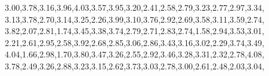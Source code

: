 \documentclass[
]{article}
\newenvironment{Shaded}{\begin{snugshade}}{\end{snugshade}}
\newcommand{\FloatTok}[1]{\textcolor[rgb]{0.00,0.00,0.81}{#1}}
\newcommand{\NormalTok}[1]{#1}
\begin{document}
\begin{Shaded}
\begin{Highlighting}[]
               \FloatTok{3.00}\NormalTok{,}\FloatTok{3.78}\NormalTok{,}\FloatTok{3.16}\NormalTok{,}\FloatTok{3.96}\NormalTok{,}\FloatTok{4.03}\NormalTok{,}\FloatTok{3.57}\NormalTok{,}\FloatTok{3.95}\NormalTok{,}\FloatTok{3.20}\NormalTok{,}\FloatTok{2.41}\NormalTok{,}\FloatTok{2.58}\NormalTok{,}\FloatTok{2.79}\NormalTok{,}\FloatTok{3.23}\NormalTok{,}\FloatTok{2.77}\NormalTok{,}\FloatTok{2.97}\NormalTok{,}\FloatTok{3.34}\NormalTok{,}
               \FloatTok{3.13}\NormalTok{,}\FloatTok{3.78}\NormalTok{,}\FloatTok{2.70}\NormalTok{,}\FloatTok{3.14}\NormalTok{,}\FloatTok{3.25}\NormalTok{,}\FloatTok{2.26}\NormalTok{,}\FloatTok{3.99}\NormalTok{,}\FloatTok{3.10}\NormalTok{,}\FloatTok{3.76}\NormalTok{,}\FloatTok{2.92}\NormalTok{,}\FloatTok{2.69}\NormalTok{,}\FloatTok{3.58}\NormalTok{,}\FloatTok{3.11}\NormalTok{,}\FloatTok{3.59}\NormalTok{,}\FloatTok{2.74}\NormalTok{,}
               \FloatTok{3.82}\NormalTok{,}\FloatTok{2.07}\NormalTok{,}\FloatTok{2.81}\NormalTok{,}\FloatTok{1.74}\NormalTok{,}\FloatTok{3.45}\NormalTok{,}\FloatTok{3.38}\NormalTok{,}\FloatTok{3.74}\NormalTok{,}\FloatTok{2.79}\NormalTok{,}\FloatTok{2.71}\NormalTok{,}\FloatTok{2.83}\NormalTok{,}\FloatTok{2.74}\NormalTok{,}\FloatTok{1.58}\NormalTok{,}\FloatTok{2.94}\NormalTok{,}\FloatTok{3.53}\NormalTok{,}\FloatTok{3.01}\NormalTok{,}
               \FloatTok{2.21}\NormalTok{,}\FloatTok{2.61}\NormalTok{,}\FloatTok{2.95}\NormalTok{,}\FloatTok{2.58}\NormalTok{,}\FloatTok{3.92}\NormalTok{,}\FloatTok{2.68}\NormalTok{,}\FloatTok{2.85}\NormalTok{,}\FloatTok{3.06}\NormalTok{,}\FloatTok{2.86}\NormalTok{,}\FloatTok{3.43}\NormalTok{,}\FloatTok{3.16}\NormalTok{,}\FloatTok{3.02}\NormalTok{,}\FloatTok{2.29}\NormalTok{,}\FloatTok{3.74}\NormalTok{,}\FloatTok{3.49}\NormalTok{,}
               \FloatTok{4.04}\NormalTok{,}\FloatTok{1.66}\NormalTok{,}\FloatTok{2.98}\NormalTok{,}\FloatTok{1.70}\NormalTok{,}\FloatTok{3.80}\NormalTok{,}\FloatTok{3.47}\NormalTok{,}\FloatTok{3.26}\NormalTok{,}\FloatTok{2.55}\NormalTok{,}\FloatTok{2.92}\NormalTok{,}\FloatTok{3.46}\NormalTok{,}\FloatTok{3.28}\NormalTok{,}\FloatTok{3.31}\NormalTok{,}\FloatTok{2.32}\NormalTok{,}\FloatTok{2.78}\NormalTok{,}\FloatTok{4.08}\NormalTok{,}
               \FloatTok{3.78}\NormalTok{,}\FloatTok{2.49}\NormalTok{,}\FloatTok{3.26}\NormalTok{,}\FloatTok{2.88}\NormalTok{,}\FloatTok{3.23}\NormalTok{,}\FloatTok{3.15}\NormalTok{,}\FloatTok{2.62}\NormalTok{,}\FloatTok{3.73}\NormalTok{,}\FloatTok{3.03}\NormalTok{,}\FloatTok{2.78}\NormalTok{,}\FloatTok{3.00}\NormalTok{,}\FloatTok{2.61}\NormalTok{,}\FloatTok{2.48}\NormalTok{,}\FloatTok{2.03}\NormalTok{,}\FloatTok{3.04}\NormalTok{,}

\end{Highlighting}
\end{Shaded}
\end{document}
